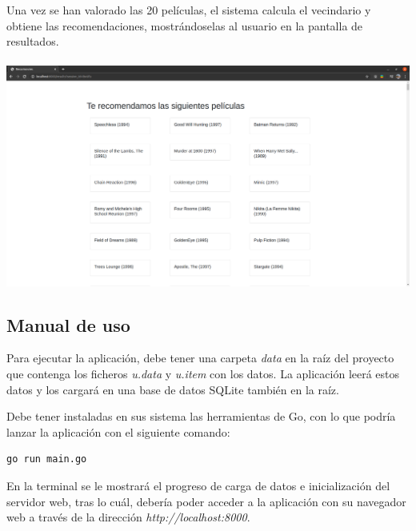 \\\\
Una vez se han valorado las 20 películas, el sistema calcula el vecindario y obtiene las recomendaciones, mostrándoselas al usuario en la pantalla de resultados.
\\\\
\includegraphics[width=\textwidth,height=\textheight,keepaspectratio]{images/results.png}

\subsection{Manual de uso}

Para ejecutar la aplicación, debe tener una carpeta \textit{data} en la raíz del proyecto que contenga los ficheros \textit{u.data} y \textit{u.item} con los datos. La aplicación leerá estos datos y los cargará en una base de datos SQLite también en la raíz.

Debe tener instaladas en sus sistema las herramientas de Go, con lo que podría lanzar la aplicación con el siguiente comando:

\begin{lstlisting}
go run main.go
\end{lstlisting}

En la terminal se le mostrará el progreso de carga de datos e inicialización del servidor web, tras lo cuál, debería poder acceder a la aplicación con su navegador web a través de la dirección \textit{http://localhost:8000}.